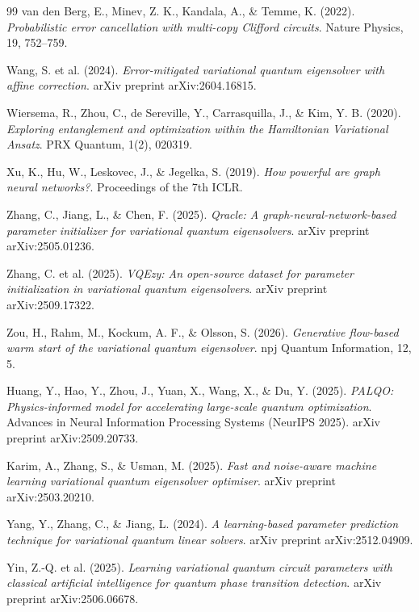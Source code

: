 \documentclass[11pt,a4paper,spanish]{book}
\begin{document}
\begin{thebibliography}{99}
 van den Berg, E., Minev, Z. K., Kandala, A., \& Temme, K. (2022). \emph{Probabilistic error cancellation with multi-copy Clifford circuits}. Nature Physics, 19, 752--759.

 Wang, S. et al. (2024). \emph{Error-mitigated variational quantum eigensolver with affine correction}. arXiv preprint arXiv:2604.16815.

 Wiersema, R., Zhou, C., de Sereville, Y., Carrasquilla, J., \& Kim, Y. B. (2020). \emph{Exploring entanglement and optimization within the Hamiltonian Variational Ansatz}. PRX Quantum, 1(2), 020319.

 Xu, K., Hu, W., Leskovec, J., \& Jegelka, S. (2019). \emph{How powerful are graph neural networks?}. Proceedings of the 7th ICLR.

 Zhang, C., Jiang, L., \& Chen, F. (2025). \emph{Qracle: A graph-neural-network-based parameter initializer for variational quantum eigensolvers}. arXiv preprint arXiv:2505.01236.

 Zhang, C. et al. (2025). \emph{VQEzy: An open-source dataset for parameter initialization in variational quantum eigensolvers}. arXiv preprint arXiv:2509.17322.

 Zou, H., Rahm, M., Kockum, A. F., \& Olsson, S. (2026). \emph{Generative flow-based warm start of the variational quantum eigensolver}. npj Quantum Information, 12, 5.

 Huang, Y., Hao, Y., Zhou, J., Yuan, X., Wang, X., \& Du, Y. (2025). \emph{PALQO: Physics-informed model for accelerating large-scale quantum optimization}. Advances in Neural Information Processing Systems (NeurIPS 2025). arXiv preprint arXiv:2509.20733.

 Karim, A., Zhang, S., \& Usman, M. (2025). \emph{Fast and noise-aware machine learning variational quantum eigensolver optimiser}. arXiv preprint arXiv:2503.20210.

 Yang, Y., Zhang, C., \& Jiang, L. (2024). \emph{A learning-based parameter prediction technique for variational quantum linear solvers}. arXiv preprint arXiv:2512.04909.

 Yin, Z.-Q. et al. (2025). \emph{Learning variational quantum circuit parameters with classical artificial intelligence for quantum phase transition detection}. arXiv preprint arXiv:2506.06678.

\end{thebibliography}
\end{document}
